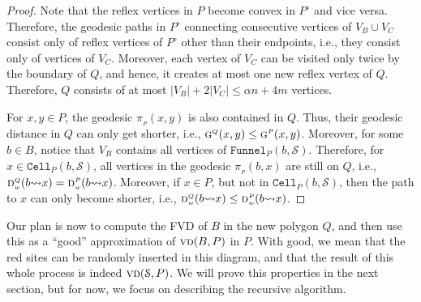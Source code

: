 \documentclass[a4paper,UKenglish]{socg-lipics-v2018}
\newcommand{\s}{\mathcal S}
\newcommand{\g}[3][P]{\ensuremath{\textsc{g}^{\scriptscriptstyle #1}(#2, #3)}}
\newcommand{\dd}[3][P]{\ensuremath{\textsc{d}_{\scriptscriptstyle w}^{\scriptscriptstyle #1}(#2 {\leadsto} #3)}}
\newcommand{\p}[3][P]{\ensuremath{\pi_{_{#1}}(#2, #3)}}
\newcommand{\funnel}[2][P]{\ensuremath{\mathtt{Funnel}_{\scriptscriptstyle #1}(#2)}}
\newcommand{\cell}[2][P]{\ensuremath{\mathtt{Cell}_{\scriptscriptstyle #1}(#2)}}
\newcommand{\vd}[2][P]{\textsc{vd}(#2, #1)}
\begin{document}
{\begin{proof}
Note that the reflex vertices in $P$ become convex in $P^\circ$ and vice versa. 
Therefore, the geodesic paths in $P^\circ$ connecting consecutive vertices of $V_B\cup V_C$ consist only of reflex vertices of $P^\circ$ other than their endpoints, i.e., they consist only of vertices of $V_C$.  
Moreover, each vertex of $V_C$ can be visited only twice by the boundary of $Q$, and hence, it creates at most one new reflex vertex of $Q$.
Therefore, $Q$ consists of at most $|V_B| +  2|V_C| \leq \alpha n + 4m$ vertices.

For $x,y\in P$, the geodesic $\p{x}{y}$ is also contained in $Q$. Thus, their geodesic distance in $Q$ can only get shorter, i.e., $\g[Q]{x}{y} \leq \g{x}{y}$.
Moreover, for some $b\in B$, notice that $V_B$ contains all vertices of $\funnel{b, \s}$. Therefore, for $x\in \cell{b,\s}$, all vertices in the geodesic $\p{b}{x}$ are still on $Q$, i.e., $\dd[Q]{b}{x} = \dd{b}{x}$. Moreover, if $x\in P$, but not in $\cell{b,\s}$, then the path to $x$ can only become shorter, i.e., $\dd[Q]{b}{x} \leq \dd{b}{x}$.
\end{proof}
}



Our plan is now to compute the FVD of $B$ in the new polygon $Q$, and then use this as a ``good'' approximation of $\vd{B}$ in $P$. 
With good, we mean that the red sites can be randomly inserted in this diagram, and that the result of this whole process is indeed $\vd{\s}$. 
We will prove this properties in the next section, but for now, we focus on describing the recursive algorithm.
\end{document}
